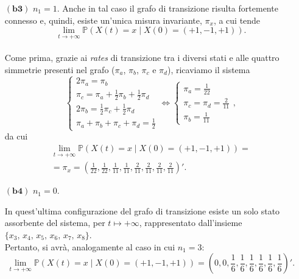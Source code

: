 \documentclass[11pt,largemargins]{homework}
\begin{document}
\begin{alphaparts}
\begin{itemize}
  
  \newpage
   \item[$\left(\textbf{b3}\right)$] $n_{1}=1$. 
  Anche in tal caso il grafo di transizione risulta fortemente connesso e, quindi, esiste un'unica misura invariante, $\pi_{x}$, a cui tende $$\lim\limits_{t \rightarrow +\infty}\mathbb{P}\left(X\left(t\right)=x\mid X\left(0\right)=\left(+1,-1,+1\right)\right).$$\\
  Come prima, grazie  ai \emph{rates} di transizione tra i diversi stati e alle quattro simmetrie presenti nel grafo ($\pi_{a}$, $\pi_{b}$, $\pi_{c}$ e $\pi_{d}$), ricaviamo il sistema
  \begin{equation*}
  \begin{cases}
    2\pi_{a}=\pi_{b}\\
    \pi_{c}=\pi_{a}+\frac{1}{2}\pi_{b}+\frac{1}{2}\pi_{d}\\
    2\pi_{b}=\frac{1}{2}\pi_{c}+\frac{1}{2}\pi_{d}\\
    \pi_{a}+\pi_{b}+\pi_{c}+\pi_{d}=\frac{1}{2}
  \end{cases}
  \Leftrightarrow
  \begin{cases}\pi_{a}=\frac{1}{22}\\
  \pi_{c}=\pi_{d}=\frac{2}{11}\\
  \pi_{b}=\frac{1}{11}\end{cases},
  \end{equation*}
  da cui
  \begin{gather*}
  \lim\limits_{t \rightarrow +\infty}\mathbb{P}\left(X\left(t\right)=x\mid X\left(0\right)=\left(+1,-1,+1\right)\right)=\\
  =\pi_{x}=\left(\frac{1}{22},\frac{1}{22},\frac{1}{11},\frac{1}{11},\frac{2}{11},\frac{2}{11},\frac{2}{11},\frac{2}{11}\right)'.
  \end{gather*}
  
  \newpage
  \item[$\left(\textbf{b4}\right)$] $n_{1}=0$. 
  
  
  In quest'ultima configurazione del grafo di transizione esiste un solo stato assorbente del sistema, per $t\mapsto +\infty$, rappresentato dall'insieme $\{x_{3}, \, x_{4}, \, x_{5}, \, x_{6}, \, x_{7}, \, x_{8}\}$.\\
  Pertanto, si avrà, analogamente al caso in cui \(n_1 = 3\):
  \begin{equation*}
  \lim\limits_{t \rightarrow +\infty}\mathbb{P}\left(X\left(t\right)=x\mid X\left(0\right)=\left(+1,-1,+1\right)\right)=\left(0,0,\frac{1}{6},\frac{1}{6},\frac{1}{6},\frac{1}{6},\frac{1}{6},\frac{1}{6}\right)'.
\end{equation*}
   
   \end{itemize}
   \end{alphaparts}
\end{document}
